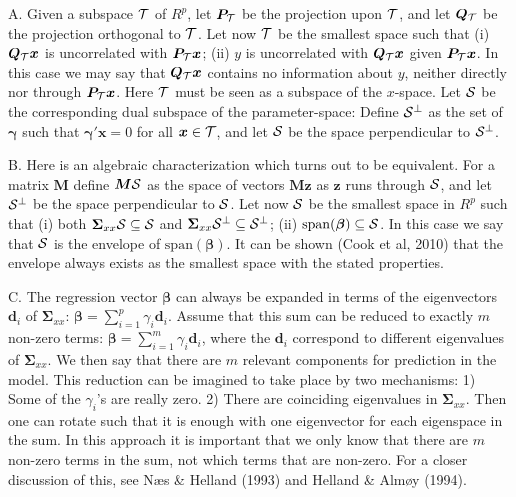 \documentclass[11pt]{article}
\begin{document}
A. Given a subspace $\cal{T}$ of $R^p$, let $\bm{P}_{\cal{T}}$ be the projection upon $\cal{T}$, and let $\bm{Q}_{\cal{T}}$ be the projection orthogonal to 
$\cal{T}$. Let now $\cal{T}$ be the smallest space such that (i) $\bm{Q}_{\cal{T}}\bm{x}$ is uncorrelated with $\bm{P}_{\cal{T}}\bm{x}$; (ii) $y$ 
is uncorrelated with $\bm{Q}_{\cal{T}}\bm{x}$ given $\bm{P}_{\cal{T}}\bm{x}$. In this case we may say that $\bm{Q}_{\cal{T}}\bm{x}$ contains 
no information about $y$, neither directly nor through $\bm{P}_{\cal{T}}\bm{x}$. Here $\cal{T}$ must be seen as a subspace of the $x$-space. Let $\cal{S}$ be the corresponding dual subspace of the parameter-space: Define $\cal{S}^\perp$ as the set of $\bm{\gamma}$ such that $\bm{\gamma}'\bm{x}=0$ for all $\bm{x}\in\cal{T}$, and let $\cal{S}$ be the space perpendicular to $\cal{S}^\perp$. 
\smallskip

B. Here is an algebraic characterization which turns out to be equivalent. For a matrix $\bm{M}$ define $\bm{M}\cal{S}$ as the space of vectors $\bm{Mz}$ as $\bm{z}$ runs through $\cal{S}$, and let $\cal{S}^\perp$ be 
the space perpendicular to $\cal{S}$. Let now $\cal{S}$ be the smallest space in $R^p$ such that (i) both $\bm{\Sigma}_{xx}\cal{S}\subseteq\cal{S}$ and 
$\bm{\Sigma}_{xx}\cal{S}^\perp\subseteq\cal{S}^\perp$; (ii) $\mathrm{span}(\bm{\beta})\subseteq\cal{S}$. In this case we say that $\cal{S}$ 
is the envelope of $\mathrm{span}(\bm{\beta})$. It can be shown (Cook et al, 2010) that the envelope always exists as the smallest space with the stated properties.
\smallskip

C. The regression vector $\bm{\beta}$ can always be expanded in terms of the eigenvectors $\bm{d}_{i}$ of $\bm{\Sigma}_{xx}$: 
$\bm{\beta}=\sum_{i=1}^p \gamma_{i}\bm{d}_{i}$. Assume that this sum can be reduced to exactly $m$ non-zero terms:
$\bm{\beta}=\sum_{i=1}^m \gamma_{i}\bm{d}_{i}$, where the $\bm{d}_i$ correspond to different eigenvalues of $\bm{\Sigma}_{xx}$. We then say that there are $m$ relevant components for prediction in the model. This reduction can be imagined to take place by two mechanisms: 1) Some of the $\gamma_i$'s are really zero. 2) There are coinciding eigenvalues in $\bm{\Sigma}_{xx}$. Then one can rotate such that it is enough with one eigenvector for each eigenspace in the sum. In this approach it is important that we only know that there are $m$ non-zero terms in the sum, not which  terms that are non-zero. For a closer discussion of this, see N\ae s \& Helland (1993) and Helland \& Alm\o y (1994).
\smallskip
\end{document}

